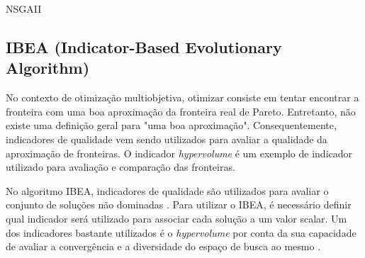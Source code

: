 \begin{algorithm}[htb!]
	\begin{algorithmic}[1]
		\EndWhile
		\EndWhile
		
		\EndWhile
	\end{algorithmic}
	\caption{NSGAII}
	\label{alg:nsgaII}
\end{algorithm}



\subsection{IBEA (Indicator-Based Evolutionary Algorithm)}

No contexto de otimização multiobjetiva, otimizar consiste em tentar encontrar a fronteira com uma boa aproximação da fronteira real de Pareto. 
Entretanto, não existe uma definição geral para "uma boa aproximação". Consequentemente, indicadores de qualidade vem sendo utilizados
para avaliar a qualidade da aproximação de fronteiras. O indicador \textit{hypervolume} é um exemplo de indicador utilizado para avaliação e comparação 
das fronteiras.

No algoritmo IBEA, indicadores de qualidade são	utilizados para avaliar o conjunto de soluções não dominadas \cite{figueiredo2013algoritmo}.
Para utilizar o IBEA, é necessário definir qual indicador será utilizado para associar cada solução a um valor scalar. Um dos indicadores bastante utilizados é o \textit{hypervolume} por conta da sua capacidade de avaliar a convergência e a diversidade do espaço de busca ao mesmo \cite{ishibuchi2008evolutionary}.

